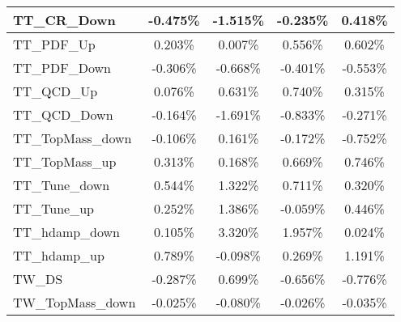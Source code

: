 \begin{table}[]
{\begin{tabular}{|l|c|c|c|c|}
TT\_CR\_Down                      & -0.475\%                         & -1.515\%                        & -0.235\%                       & 0.418\%                        \\ \hline
TT\_PDF\_Up                        & 0.203\%                         & 0.007\%                         & 0.556\%                        & 0.602\%                       \\ \hline
TT\_PDF\_Down                      & -0.306\%                       & -0.668\%                       & -0.401\%                      & -0.553\%                       \\ \hline
TT\_QCD\_Up                        & 0.076\%                         & 0.631\%                         & 0.740\%                        & 0.315\%                       \\ \hline
TT\_QCD\_Down                      & -0.164\%                       & -1.691\%                       & -0.833\%                      & -0.271\%                       \\ \hline
TT\_TopMass\_down                      & -0.106\%                       & 0.161\%                       & -0.172\%                      & -0.752\%                       \\ \hline
TT\_TopMass\_up                      & 0.313\%                       & 0.168\%                       & 0.669\%                      & 0.746\%                       \\ \hline
TT\_Tune\_down            & 0.544\%             & 1.322\%             & 0.711\%            & 0.320\%             \\ \hline
TT\_Tune\_up              & 0.252\%               & 1.386\%               & -0.059\%              & 0.446\%               \\ \hline
TT\_hdamp\_down                  & 0.105\%                         & 3.320\%                      & 1.957\%                        & 0.024\%                   \\ \hline
TT\_hdamp\_up                    & 0.789\%                           & -0.098\%                        & 0.269\%                          & 1.191\%                     \\ \hline
TW\_DS                      & -0.287\%                             & 0.699\%                          & -0.656\%                            & -0.776\%                       \\ \hline
TW\_TopMass\_down                & -0.025\%                       & -0.080\%                    & -0.026\%                      & -0.035\%                 \\ \hline

\end{tabular}}
\end{table}
